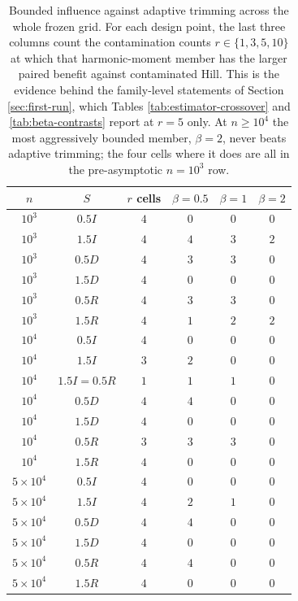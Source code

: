 \begin{table}[t]
\centering
\small
\begin{tabular}{cccccc}
\toprule
$n$ & $S$ & $r$ cells & $\beta{=}0.5$ & $\beta{=}1$ & $\beta{=}2$\\
\midrule
$10^3$ & $0.5I$ & $4$ & $0$ & $0$ & $0$\\
$10^3$ & $1.5I$ & $4$ & $4$ & $3$ & $2$\\
$10^3$ & $0.5D$ & $4$ & $3$ & $3$ & $0$\\
$10^3$ & $1.5D$ & $4$ & $0$ & $0$ & $0$\\
$10^3$ & $0.5R$ & $4$ & $3$ & $3$ & $0$\\
$10^3$ & $1.5R$ & $4$ & $1$ & $2$ & $2$\\
\midrule
$10^4$ & $0.5I$ & $4$ & $0$ & $0$ & $0$\\
$10^4$ & $1.5I$ & $3$ & $2$ & $0$ & $0$\\
$10^4$ & $1.5I{=}0.5R$ & $1$ & $1$ & $1$ & $0$\\
$10^4$ & $0.5D$ & $4$ & $4$ & $0$ & $0$\\
$10^4$ & $1.5D$ & $4$ & $0$ & $0$ & $0$\\
$10^4$ & $0.5R$ & $3$ & $3$ & $3$ & $0$\\
$10^4$ & $1.5R$ & $4$ & $0$ & $0$ & $0$\\
\midrule
$5{\times}10^4$ & $0.5I$ & $4$ & $0$ & $0$ & $0$\\
$5{\times}10^4$ & $1.5I$ & $4$ & $2$ & $1$ & $0$\\
$5{\times}10^4$ & $0.5D$ & $4$ & $4$ & $0$ & $0$\\
$5{\times}10^4$ & $1.5D$ & $4$ & $0$ & $0$ & $0$\\
$5{\times}10^4$ & $0.5R$ & $4$ & $4$ & $0$ & $0$\\
$5{\times}10^4$ & $1.5R$ & $4$ & $0$ & $0$ & $0$\\
\bottomrule
\end{tabular}
\caption{Bounded influence against adaptive trimming across the whole frozen grid.  For each design point, the last three columns count the contamination counts $r\in\{1,3,5,10\}$ at which that harmonic-moment member has the larger paired benefit against contaminated Hill.  This is the evidence behind the family-level statements of Section \ref{sec:first-run}, which Tables \ref{tab:estimator-crossover} and \ref{tab:beta-contrasts} report at $r=5$ only.  At $n\ge10^4$ the most aggressively bounded member, $\beta=2$, never beats adaptive trimming; the four cells where it does are all in the pre-asymptotic $n=10^3$ row.}
\label{tab:beta-r-sweep}
\end{table}
